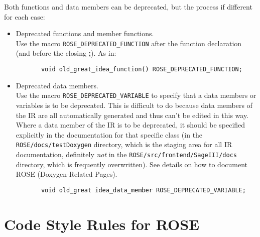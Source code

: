 Both functions and data members can be deprecated, but the process if different 
for each case:
\begin{itemize}
    \item Deprecated functions and member functions. \\
          Use the macro {\tt ROSE\_DEPRECATED\_FUNCTION} after the function declaration (and before
          the closing {\bf ;}). As in:
{\indent
{\mySmallFontSize
\begin{verbatim}
       void old_great_idea_function() ROSE_DEPRECATED_FUNCTION;
\end{verbatim}
}}

    \item Deprecated data members. \\
        Use the macro {\tt ROSE\_DEPRECATED\_VARIABLE} to specify that a data members 
    or variables is to be deprecated.  This is difficult to do because data members of 
    the IR are all automatically generated and thus can't be edited in this way.  Where 
    a data member of the IR is to be deprecated, it should be specified explicitly in
    the documentation for that specific class (in the {\tt ROSE/docs/testDoxygen} directory,
    which is the staging area for all IR documentation, definitely {\em not} in the 
    {\tt ROSE/src/frontend/SageIII/docs} directory, which is frequently overwritten).  See
    details on how to document ROSE (Doxygen-Related Pages).
{\indent
{\mySmallFontSize
\begin{verbatim}
       void old_great idea_data_member ROSE_DEPRECATED_VARIABLE;
\end{verbatim} 
}}
\end{itemize}



\section{Code Style Rules for ROSE}

